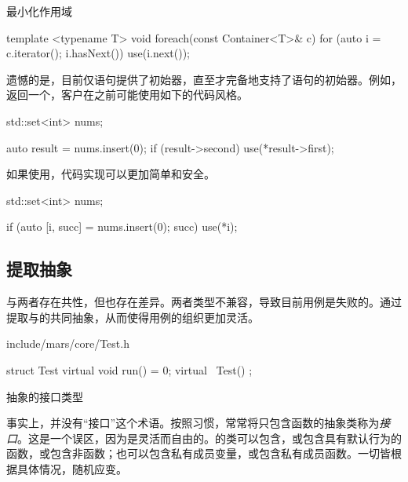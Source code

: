 \begin{content}
\begin{episode}{最小化作用域}
\begin{content}
 \begin{c++}[title={\ttfamily{for循环}}]
template <typename T>
void foreach(const Container<T>& c) {
  for (auto i = c.iterator(); i.hasNext()) {
    use(i.next());
  } 
}
 \end{c++}

遗憾的是，目前仅语句提供了初始器，直至才完备地支持了语句的初始器。例如，返回一个，客户在之前可能使用如下的代码风格。

 \begin{c++}[title={\ttfamily{插入元素：C++17之前}}]
std::set<int> nums;

auto result = nums.insert(0);
if (result->second) {
  use(*result->first);
}
 \end{c++}

如果使用，代码实现可以更加简单和安全。

 \begin{c++}[title={\ttfamily{插入元素：if初始化器与结构性绑定，C++17}}]
std::set<int> nums;

if (auto [i, succ] = nums.insert(0); succ) {
  use(*i);
}
 \end{c++}

\end{content}
\end{episode}

\subsection{提取抽象}

与两者存在共性，但也存在差异。两者类型不兼容，导致目前用例是失败的。通过提取与的共同抽象，从而使得用例的组织更加灵活。

\begin{nodiff}{include/mars/core/Test.h}
 \begin{c++}
struct Test {
  virtual void run() = 0;
  virtual ~Test() {}
};
 \end{c++}
\end{nodiff}

\begin{episode}{抽象的接口类型}

\begin{content}

事实上，\cpp{}并没有“接口”这个术语。按照习惯，常常将只包含函数的抽象类称为\emph{接口}。这是一个误区，因为\cpp{}是灵活而自由的。\cpp{}的类可以包含，或包含具有默认行为的函数，或包含非函数；也可以包含私有成员变量，或包含私有成员函数。一切皆根据具体情况，随机应变。


\end{content}
\end{episode}
\end{content}
